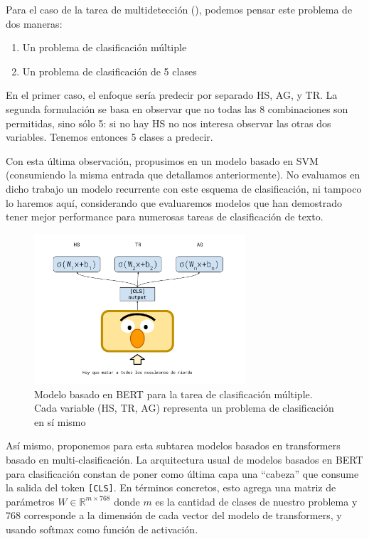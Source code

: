Para el caso de la tarea de multidetección (\subtaskb{}), podemos pensar este problema de dos maneras:

\begin{enumerate}
    \item Un problema de clasificación múltiple
    \item Un problema de clasificación de 5 clases
\end{enumerate}

En el primer caso, el enfoque sería predecir por separado HS, AG, y TR. La segunda formulación se basa en observar que no todas las 8 combinaciones son permitidas, sino sólo 5: si no hay HS no nos interesa observar las otras dos variables. Tenemos entonces 5 clases a predecir.

Con esta última observación, propusimos en \citet{atalaya_tass2018} un modelo basado en SVM (consumiendo la misma entrada que detallamos anteriormente). No evaluamos en dicho trabajo un modelo recurrente con este esquema de clasificación, ni tampoco lo haremos aquí, considerando que evaluaremos modelos que han demostrado tener mejor performance para numerosas tareas de clasificación de texto.

\begin{figure}
    \centering
    \includegraphics[width=0.7\textwidth]{img/bert_model_hateval.pdf}
    \caption{Modelo basado en BERT para la tarea de clasificación múltiple. Cada variable (HS, TR, AG) representa un problema de clasificación en sí mismo}
    \label{fig:bert_hateval_classifier}
\end{figure}


Así mismo, proponemos para esta subtarea modelos basados en transformers basado en multi-clasificación. La arquitectura usual de modelos basados en BERT para clasificación constan de poner como última capa una  ``cabeza'' que consume la salida del token \verb|[CLS]|. En términos concretos, esto agrega una matriz de parámetros $W \in \mathbb{R}^{m \times 768}$ donde $m$ es la cantidad de clases de nuestro problema y 768 corresponde a la dimensión de cada vector del modelo de transformers, y usando softmax como función de activación.


